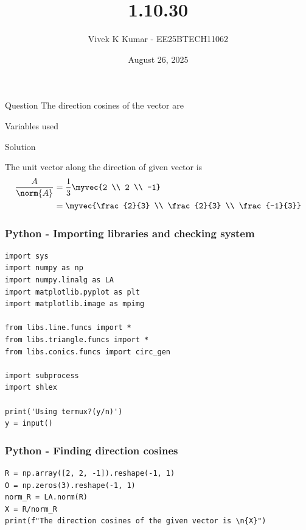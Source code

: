 \documentclass{beamer}
\title 
{1.10.30}
\date{August 26, 2025}
\author 
{Vivek K Kumar - EE25BTECH11062}
\begin{document}
\frame{\titlepage}
\begin{frame}{Question}
The direction cosines of the vector  are \underline{\hspace{0.1\columnwidth}}
\end{frame}



\begin{frame}{Variables used}
\begin{table}[H]    
  \centering
  
  \caption{Variables Used}
  \label{tab:1.10.30}
\end{table}

\end{frame}

\begin{frame}{Solution}

The unit vector along the direction of given vector is\\
\begin{align}
\frac{A}{\norm{A}} &= \frac{1}{3}\myvec{2 \\ 2 \\ -1} \\
 &=\myvec{\frac{2}{3} \\ \frac{2}{3} \\ \frac{-1}{3}}
\end{align}

\end{frame}

\begin{frame}[fragile]
    \frametitle{Python - Importing libraries and checking system}
    \begin{lstlisting}
import sys
import numpy as np
import numpy.linalg as LA
import matplotlib.pyplot as plt
import matplotlib.image as mpimg

from libs.line.funcs import *
from libs.triangle.funcs import *
from libs.conics.funcs import circ_gen

import subprocess
import shlex

print('Using termux?(y/n)')
y = input()
\end{lstlisting}
\end{frame}

\begin{frame}[fragile]
    \frametitle{Python - Finding direction cosines}
    \begin{lstlisting}
R = np.array([2, 2, -1]).reshape(-1, 1)
O = np.zeros(3).reshape(-1, 1)
norm_R = LA.norm(R)
X = R/norm_R
print(f"The direction cosines of the given vector is \n{X}")
\end{lstlisting}
\end{frame}
\end{document}
